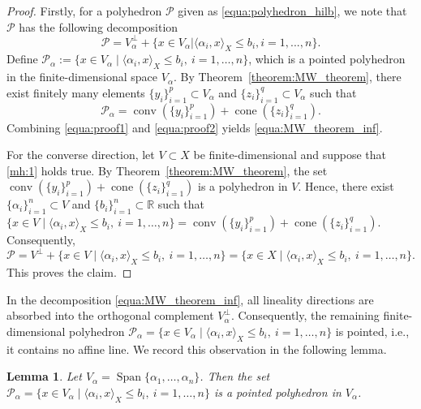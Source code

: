 \documentclass{article}
\numberwithin{equation}{section}
\newtheorem{lemma}{Lemma}[section]
\begin{document}
\begin{proof}
Firstly, for a polyhedron $\mathcal{P}$ given as \eqref{equa:polyhedron_hilb}, we note that $\mathcal{P}$ has the following decomposition
\begin{equation}
            \mathcal{P}=V_\alpha^\bot+ \{x\in V_\alpha|\langle \alpha_i,x\rangle_X\le b_i,i=1,...,n\}.
     \label{equa:proof1}
\end{equation}
Define
$
\mathcal{P}_\alpha
:=
\{x\in V_\alpha \mid \langle \alpha_i,x\rangle_X\le b_i,\ i=1,\dots,n\}$, which is a pointed polyhedron in the finite-dimensional space $V_\alpha$. By Theorem~\ref{theorem:MW_theorem}, there exist finitely many elements $\{y_i\}_{i=1}^p\subset V_\alpha$ and $\{z_i\}_{i=1}^q\subset V_\alpha$ such that
\begin{equation}
    \mathcal{P}_\alpha
    =
    \operatorname{conv}(\{y_i\}_{i=1}^p)
    +
    \operatorname{cone}(\{z_i\}_{i=1}^q).
    \label{equa:proof2}
\end{equation}
Combining \eqref{equa:proof1} and \eqref{equa:proof2} yields \eqref{equa:MW_theorem_inf}.

For the converse direction, let $V\subset X$ be finite-dimensional and suppose that \eqref{mh:1} holds true.
By Theorem~\ref{theorem:MW_theorem}, the set
$
\operatorname{conv}(\{y_i\}_{i=1}^p)
+
\operatorname{cone}(\{z_i\}_{i=1}^q)
$
is a polyhedron in $V$. Hence, there exist  $\{\alpha_i\}_{i=1}^n\subset V$ and $\{b_i\}_{i=1}^n\subset \mathbb{R}$ such that
$\{x\in V \mid \langle \alpha_i,x\rangle_X\le b_i,\ i=1,\dots,n\}
=
\operatorname{conv}(\{y_i\}_{i=1}^p)
+
\operatorname{cone}(\{z_i\}_{i=1}^q)$.
Consequently,
\begin{equation}
\mathcal{P}
=
V^\perp
+
\{x\in V \mid \langle \alpha_i,x\rangle_X\le b_i,\ i=1,\dots,n\}=
\{x\in X \mid \langle \alpha_i,x\rangle_X\le b_i,\ i=1,\dots,n\}.
\end{equation}
This proves the claim.
\end{proof}

In the decomposition \eqref{equa:MW_theorem_inf}, all lineality directions are absorbed into the orthogonal complement $V_\alpha^\perp$. Consequently, the remaining finite-dimensional polyhedron $\mathcal{P}_\alpha
=
\{x\in V_\alpha \mid \langle \alpha_i,x\rangle_X\le b_i,\ i=1,\dots,n\}$ is pointed, i.e., it contains no affine line. We record this observation in the following lemma.

\begin{lemma}\label{lem:pointed}
Let $V_\alpha=\operatorname{Span}\{\alpha_1,\dots,\alpha_n\}$. Then the set
    $\mathcal{P}_\alpha=
    \{x\in V_\alpha \mid \langle \alpha_i,x\rangle_X\le b_i,\ i=1,\dots,n\}$
is a pointed polyhedron in $V_\alpha$.
\end{lemma}
\end{document}
